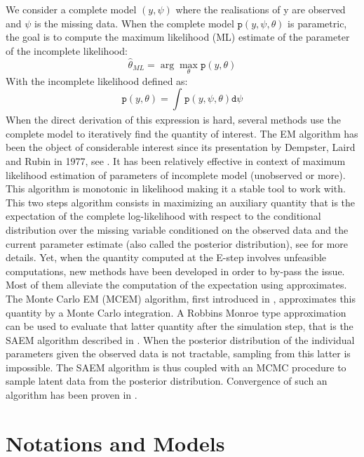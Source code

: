 \documentclass[a4paper]{article}
\theoremstyle{plain}
\newcommand{\dens}{\texttt{p}}
\theoremstyle{plain}
\theoremstyle{definition}
\begin{document}
We consider a complete model $(y,\psi)$ where the realisations of y are observed and $\psi$ is the missing data. When the complete model $\dens(y,\psi,\theta)$ is parametric, the goal is to compute the maximum likelihood (ML) estimate of the parameter of the incomplete likelihood:
\begin{equation}
\hat{\theta}_{ML} = \arg\max \limits_{\theta} \dens(y,\theta)
\end{equation}
With the incomplete likelihood defined as:
\begin{equation}
\dens(y,\theta) = \int_{}{\dens(y,\psi,\theta)\texttt{d}\psi}
\end{equation}
When the direct derivation of this expression is hard, several methods use the complete model to iteratively find the quantity of interest.
The EM algorithm has been the object of considerable interest since its presentation by Dempster, Laird and Rubin in 1977, see \cite{dempster}. It has been relatively effective in context of maximum likelihood estimation of parameters of incomplete model (unobserved or more). This algorithm is monotonic in likelihood making it a stable tool to work with.
This two steps algorithm consists in maximizing an auxiliary quantity that is the expectation of the complete log-likelihood with respect to the conditional distribution over the missing variable conditioned on the observed data and the current parameter estimate (also called the posterior distribution), see \cite{wu} for more details.
Yet, when the quantity computed at the E-step involves unfeasible computations, new methods have been developed in order to by-pass the issue.  Most of them alleviate the computation of the expectation using approximates.  The Monte Carlo EM (MCEM) algorithm,  first introduced in \cite{wei},  approximates this quantity by a Monte Carlo integration. A Robbins Monroe type approximation can be used to evaluate that latter quantity after the simulation step, that is the SAEM algorithm described in \cite{lavielle2}. When the posterior distribution of the individual parameters given the observed data is not tractable, sampling from this latter is impossible. The SAEM algorithm is thus coupled with an MCMC procedure to sample latent data from the posterior distribution. Convergence of such an algorithm has been proven in \cite{kuhn}.\\


\section{Notations and Models}
\end{document}
